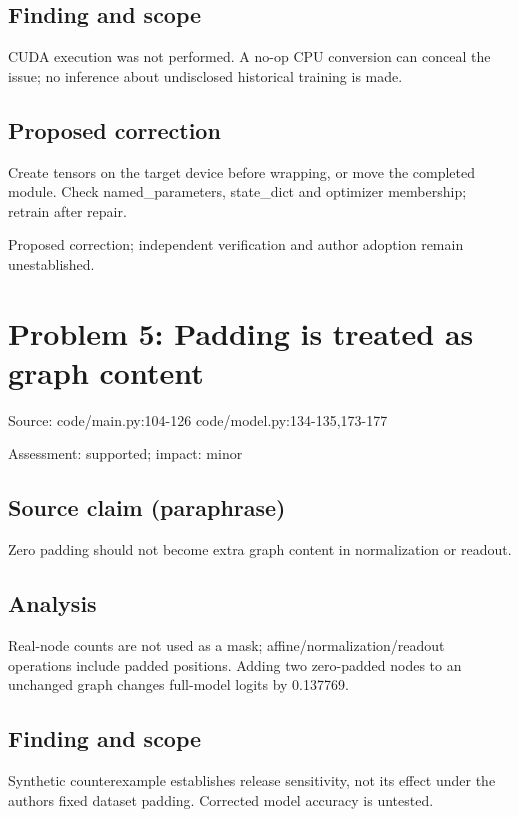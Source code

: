 \documentclass[11pt]{article}
\begin{document}
\subsection*{Finding and scope}

CUDA execution was not performed. A no-op CPU conversion can conceal the issue; no inference about undisclosed historical training is made.

\subsection*{Proposed correction}

Create tensors on the target device before wrapping, or move the completed module. Check named\_parameters, state\_dict and optimizer membership; retrain after repair.

Proposed correction; independent verification and author adoption remain unestablished.

\section*{Problem 5: Padding is treated as graph content}

Source: code/main.py:104-126 code/model.py:134-135,173-177

Assessment: supported; impact: minor

\subsection*{Source claim (paraphrase)}

Zero padding should not become extra graph content in normalization or readout.

\subsection*{Analysis}

Real-node counts are not used as a mask; affine/normalization/readout operations include padded positions. Adding two zero-padded nodes to an unchanged graph changes full-model logits by 0.137769.

\subsection*{Finding and scope}

Synthetic counterexample establishes release sensitivity, not its effect under the authors fixed dataset padding. Corrected model accuracy is untested.
\end{document}
